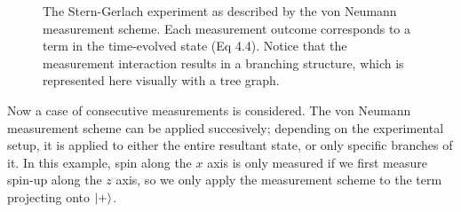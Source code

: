 \begin{figure}
\centering\CaptionFontSize


\caption[Insert an abbreviated caption here to show in the List of Figures]
{The Stern-Gerlach experiment as described by the von Neumann measurement scheme. Each measurement outcome corresponds to a term in the time-evolved state (Eq 4.4). Notice that the measurement interaction results in a branching structure, which is represented here visually with a tree graph. }
\label{Figure:Measurement:labelthis2}
\end{figure}

Now a case of consecutive measurements is considered. The von Neumann measurement scheme can be applied succesively; depending on the experimental setup, it is applied to either the entire resultant state, or only specific branches of it. In this example, spin along the $x$ axis is only measured if we first measure spin-up along the $z$ axis, so we only apply the measurement scheme to the term projecting onto ${\ket{+}}$.


